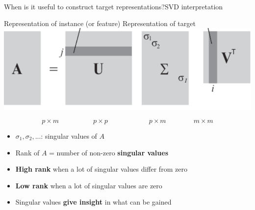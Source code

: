 \documentclass[]{beamer}
\renewcommand{\alert}[1]{\textbf{\color{putblue} #1}}
\begin{document}
\begin{frame}{When is it useful to construct target representations?}{SVD interpretation}
\begin{center}
Representation of instance (or feature) \hspace{1cm} Representation of target
\includegraphics[scale=0.5]{Figures/svd} 
\end{center}
\vspace{-0.3cm}
$$p \times m \qquad \quad \qquad p \times p \qquad \qquad \qquad p \times m \qquad \qquad m \times m$$
\vspace{-0.3cm}
\begin{itemize}
\item $\sigma_1,\sigma_2,...$: singular values of $A$
\item Rank of $A$ = number of non-zero \alert{singular values} \pause 
\item \alert{High rank} when a lot of singular values differ from zero
\item \alert{Low rank} when a lot of singular values are zero
\item Singular values \alert{give insight} in what can be gained
\end{itemize}
\end{frame}







\end{document}
